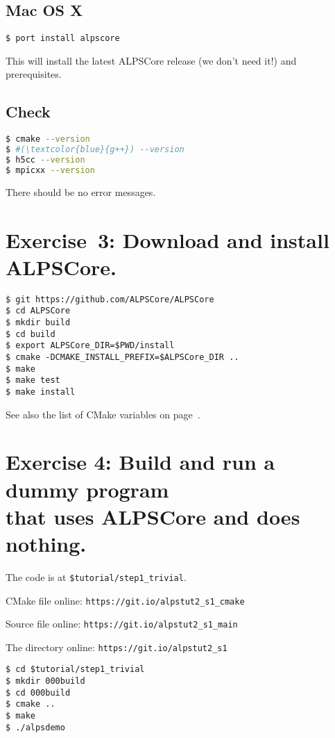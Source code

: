 \documentclass[12pt]{article}
\begin{document}
\subsection*{Mac OS X}
\begin{lstlisting}[emph={port}]
$ port install alpscore
\end{lstlisting}%
This will install the latest ALPSCore release (we don't need it!)
and prerequisites.

\subsection*{Check}
\begin{lstlisting}[language=sh,basicstyle=\ttfamily\small,emph={cmake,gcc,h5cc,mpicxx}]
$ cmake --version
$ #(\textcolor{blue}{g++}) --version
$ h5cc --version
$ mpicxx --version
\end{lstlisting}

There should be no error messages.

\section*{Exercise~3: Download and install ALPSCore.}
\begin{lstlisting}[emph={git,export,cmake,make,cd,mkdir}]
$ git https://github.com/ALPSCore/ALPSCore
$ cd ALPSCore
$ mkdir build
$ cd build
$ export ALPSCore_DIR=$PWD/install
$ cmake -DCMAKE_INSTALL_PREFIX=$ALPSCore_DIR ..
$ make
$ make test
$ make install
\end{lstlisting}%

See also the list of CMake variables on page~\pageref{ref:cmakevars}.

\section*{Exercise 4: Build and run a dummy program\\ that uses ALPSCore and does nothing.}

The code is at \texttt{\color{ballblue}\$tutorial/step1\_trivial}.

CMake file online: \nolinkurl{https://git.io/alpstut2_s1_cmake}

Source file online: \nolinkurl{https://git.io/alpstut2_s1_main}

The directory online: \nolinkurl{https://git.io/alpstut2_s1}

\begin{lstlisting}[emph={cd,mkdir}]
$ cd $tutorial/step1_trivial
$ mkdir 000build
$ cd 000build
$ cmake ..
$ make
$ ./alpsdemo
\end{lstlisting}%
\end{document}
